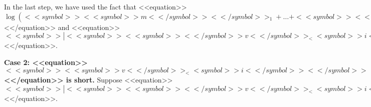 \documentclass[proceedings]{stacs}
\begin{document}
In the last step, we have used the fact that <<equation>>$\log(<<symbol>><<symbol>>m<</symbol>><</symbol>>_1 + \ldots + <<symbol>><<symbol>>m<</symbol>>_{<<symbol>>i<</symbol>><</symbol>>-1}) = <<symbol>>O<</symbol>>(<<symbol>>i<</symbol>>), \log<<symbol>>|<<symbol>><<symbol>><</symbol>>v<</symbol>>_<<symbol>>i<<symbol>><</symbol>><</symbol>>|<</symbol>> = <<symbol>>O<</symbol>>(<<symbol>>i<</symbol>>)$<</equation>> and <<equation>>$<<symbol>>|<<symbol>><<symbol>><</symbol>>v<</symbol>>_<<symbol>>i<<symbol>><</symbol>><</symbol>>|<</symbol>> = <<symbol>>\Omega<</symbol>>(<<symbol>><<symbol>>B<</symbol>>^<<symbol>>i<</symbol>><</symbol>>)$<</equation>>.

{\bf Case 2: <<equation>>$<<symbol>><<symbol>>v<</symbol>>_<<symbol>>i<</symbol>><</symbol>>$<</equation>> is short.} Suppose <<equation>>$<<symbol>>|<<symbol>><<symbol>><</symbol>>v<</symbol>>_<<symbol>>i<<symbol>><</symbol>><</symbol>>|<</symbol>> < <<symbol>>\gamma <</symbol>>\cdot <<symbol>><<symbol>>n<</symbol>>_<<symbol>>i<</symbol>><</symbol>>$<</equation>>.
\end{document}
